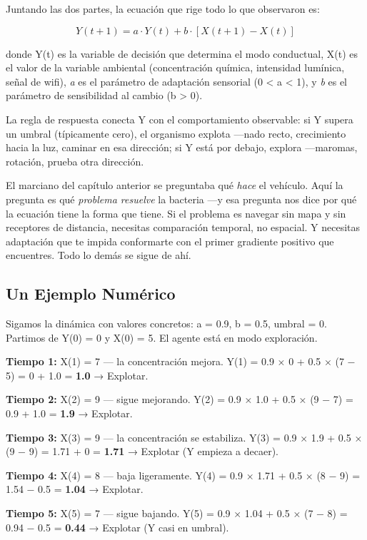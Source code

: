 \documentclass[
  letterpaper,
  DIV=11,
  numbers=noendperiod]{scrreprt}
\begin{document}
Juntando las dos partes, la ecuación que rige todo lo que observaron es:

\[Y(t+1) = a \cdot Y(t) + b \cdot [X(t+1) - X(t)]\]

donde Y(t) es la variable de decisión que determina el modo conductual,
X(t) es el valor de la variable ambiental (concentración química,
intensidad lumínica, señal de wifi), \emph{a} es el parámetro de
adaptación sensorial (0 \textless{} a \textless{} 1), y \emph{b} es el
parámetro de sensibilidad al cambio (b \textgreater{} 0).

La regla de respuesta conecta Y con el comportamiento observable: si Y
supera un umbral (típicamente cero), el organismo explota ---nado recto,
crecimiento hacia la luz, caminar en esa dirección; si Y está por
debajo, explora ---maromas, rotación, prueba otra dirección.

El marciano del capítulo anterior se preguntaba qué \emph{hace} el
vehículo. Aquí la pregunta es qué \emph{problema resuelve} la bacteria
---y esa pregunta nos dice por qué la ecuación tiene la forma que tiene.
Si el problema es navegar sin mapa y sin receptores de distancia,
necesitas comparación temporal, no espacial. Y necesitas adaptación que
te impida conformarte con el primer gradiente positivo que encuentres.
Todo lo demás se sigue de ahí.

\subsection{Un Ejemplo Numérico}\label{un-ejemplo-numuxe9rico}

Sigamos la dinámica con valores concretos: a = 0.9, b = 0.5, umbral = 0.
Partimos de Y(0) = 0 y X(0) = 5. El agente está en modo exploración.

\textbf{Tiempo 1:} X(1) = 7 --- la concentración mejora. Y(1) = 0.9 × 0
+ 0.5 × (7 − 5) = 0 + 1.0 = \textbf{1.0} → Explotar.

\textbf{Tiempo 2:} X(2) = 9 --- sigue mejorando. Y(2) = 0.9 × 1.0 + 0.5
× (9 − 7) = 0.9 + 1.0 = \textbf{1.9} → Explotar.

\textbf{Tiempo 3:} X(3) = 9 --- la concentración se estabiliza. Y(3) =
0.9 × 1.9 + 0.5 × (9 − 9) = 1.71 + 0 = \textbf{1.71} → Explotar (Y
empieza a decaer).

\textbf{Tiempo 4:} X(4) = 8 --- baja ligeramente. Y(4) = 0.9 × 1.71 +
0.5 × (8 − 9) = 1.54 − 0.5 = \textbf{1.04} → Explotar.

\textbf{Tiempo 5:} X(5) = 7 --- sigue bajando. Y(5) = 0.9 × 1.04 + 0.5 ×
(7 − 8) = 0.94 − 0.5 = \textbf{0.44} → Explotar (Y casi en umbral).
\end{document}
